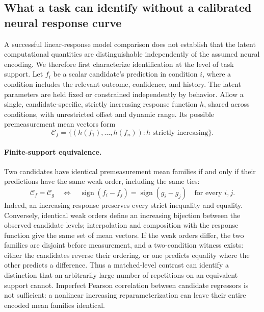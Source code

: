 \subsection{What a task can identify without a calibrated neural response curve}
\label{sec:monotone_identification}

A successful linear-response model comparison does not establish that the latent
computational quantities are distinguishable independently of the assumed neural
encoding. We therefore first characterize identification at the level of task
support. Let $f_i$ be a scalar candidate's prediction in condition $i$, where a
condition includes the relevant outcome, confidence, and history. The latent
parameters are held fixed or constrained independently by behavior. Allow a
single, candidate-specific, strictly increasing response function $h$, shared
across conditions, with unrestricted offset and dynamic range. Its possible
premeasurement mean vectors form
\begin{equation}
\mathcal C_f=\{(h(f_1),\ldots,h(f_n)):h\text{ strictly increasing}\}.
\end{equation}

\paragraph{Finite-support equivalence.}
Two candidates have identical premeasurement mean families if and only if their
predictions have the same weak order, including the same ties:
\begin{equation}
\mathcal C_f=\mathcal C_g
\quad\Longleftrightarrow\quad
\operatorname{sign}(f_i-f_j)=\operatorname{sign}(g_i-g_j)
\quad\text{for every }i,j.
\label{eq:weak_order_identification}
\end{equation}
Indeed, an increasing response preserves every strict inequality and equality.
Conversely, identical weak orders define an increasing bijection between the
observed candidate levels; interpolation and composition with the response
function give the same set of mean vectors. If the weak orders differ, the two
families are disjoint before measurement, and a two-condition witness exists:
either the candidates reverse their ordering, or one predicts equality where
the other predicts a difference. Thus a matched-level contrast can identify a
distinction that an arbitrarily large number of repetitions on an equivalent
support cannot. Imperfect Pearson correlation between candidate regressors is
not sufficient: a nonlinear increasing reparameterization can leave their
entire encoded mean families identical.

